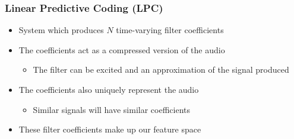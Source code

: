 \documentclass{beamer}
\begin{document}

\begin{frame}
\frametitle{Linear Predictive Coding (LPC)}
\begin{block}{}
\begin{itemize}
	\item System which produces $N$ time-varying filter coefficients
	\item The coefficients act as a compressed version of the audio
		\begin{itemize}
		\item The filter can be excited and an approximation of the signal produced
		\end{itemize}
	\item The coefficients also uniquely represent the audio
		\begin{itemize}
		\item Similar signals will have similar coefficients
		\end{itemize}
	\item These filter coefficients make up our feature space
\end{itemize}
\end{block}
\end{frame}

\end{document}
